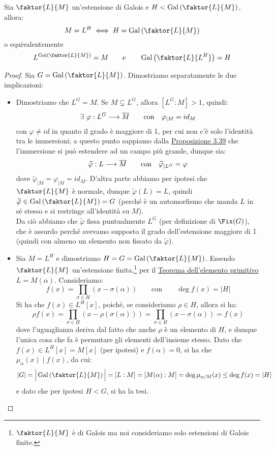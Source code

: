 \documentclass[11pt]{scrartcl}
\begin{document}
\begin{lemma}
    \label{3.67}
    Sia $\faktor{L}{M}$ un'estensione di Galois e $H < \Gal\left(\faktor{L}{M}\right)$, allora:
    \[ M = L^H \iff H = \Gal\left(\faktor{L}{M}\right)
        \]
    o equivalentemente
    \[ L^{\Gal\left(\faktor{L}{M}\right)} = M \qquad \text{e} \qquad \Gal\left(\faktor{L}{L^H}\right) = H
        \]
\end{lemma}

\begin{proof}
    Sia $G = \Gal\left(\faktor{L}{M}\right)$. Dimostriamo separatamente le due implicazioni:
    \begin{itemize}
        \item Dimostriamo che $L^G = M$. Se $M \subsetneq L^G$, allora $[L^G : M]>1$, quindi:
        \[ \exists~ \varphi : L^G \longrightarrow \overline M \qquad \text{con} \quad \varphi_{|M} = id_M
            \]
        con $\varphi \ne id$ in quanto il grado è maggiore di 1, per cui non c'è solo l'identità tra le immersioni; 
	a questo punto sappiamo dalla \hyperref[3.39]{Proposizione 3.39} che l'immersione si può estendere ad un campo più grande, dunque sia:
        \[ \widetilde{\varphi} : L \longrightarrow \overline M \qquad \text{con} \quad \widetilde{\varphi}_{|L^G} = \varphi
            \]
        dove $\widetilde{\varphi}_{|M} = \varphi_{|M} = id_M$. D'altra parte abbiamo per ipotesi che $\faktor{L}{M}$ è normale, 
	dunque $\widetilde{\varphi}(L) = L$, quindi $\widetilde{\varphi} \in \Gal\left(\faktor{L}{M}\right) = G$ 
	(perché è un automorfismo che manda $L$ in sé stesso e si restringe all'identità su $M$). \\
	Da ciò abbiamo che $\widetilde{\varphi}$ fissa puntualmente $L^G$ (per definizione di $\Fix(G)$), 
	che è assurdo perché avevamo supposto il grado dell'estensione maggiore di 1 
	(quindi con almeno un elemento non fissato da $\widetilde{\varphi}$).
        \item Sia $M = L^H$ e dimostriamo $H = G = \Gal\left(\faktor{L}{M}\right)$.
	Essendo $\faktor{L}{M}$ un'estensione finita,\footnote{$\faktor{L}{M}$ è di Galois ma noi consideriamo solo estensioni di Galois finite.}
	per il \hyperref[prim]{Teorema dell'elemento primitivo} $L = M(\alpha)$. 
	Consideriamo:
        \[ f(x) = \prod_{\sigma \in H}(x - \sigma(\alpha)) \qquad \text{con} \qquad \deg f(x) = |H|
            \]
        Si ha che $f(x) \in L^H[x]$, poiché, se consideriamo $\rho \in H$, allora si ha:
        \[ \rho f(x) = \prod_{\sigma \in H}(x - \rho(\sigma(\alpha))) = \prod_{\sigma \in H}(x - \sigma(\alpha)) = f(x)
            \]
        dove l'uguaglianza deriva dal fatto che anche $\rho$ è un elemento di $H$, e dunque l'unica cosa che fa è permutare gli elementi dell'insieme stesso.
	Dato che $f(x) \in L^H[x] = M[x]$ (per ipotesi) e $f(\alpha) = 0$, si ha che $\mu_\alpha(x) \mid f(x)$, da cui:
	\[ |G| = \Big|\Gal\left(\faktor{L}{M}\right)\Big| = [L : M] = [M(\alpha) : M] = \deg \mu_{\alpha/M}(x) \leq \deg f(x) = |H|
	    \]
        e dato che per ipotesi $H < G$, si ha la tesi.
    \end{itemize}
\end{proof}
\end{document}
